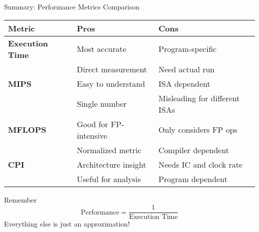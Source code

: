 \documentclass[aspectratio=169,12pt]{beamer}
\begin{document}
\begin{frame}{Summary: Performance Metrics Comparison}
\begin{table}[h]
\centering
\scriptsize
\begin{tabular}{lll}
\toprule
\textbf{Metric} & \textbf{Pros} & \textbf{Cons} \\
\midrule
\textbf{Execution Time} & Most accurate & Program-specific \\
& Direct measurement & Need actual run \\
\midrule
\textbf{MIPS} & Easy to understand & ISA dependent \\
& Single number & Misleading for different ISAs \\
\midrule
\textbf{MFLOPS} & Good for FP-intensive & Only considers FP ops \\
& Normalized metric & Compiler dependent \\
\midrule
\textbf{CPI} & Architecture insight & Needs IC and clock rate \\
& Useful for analysis & Program dependent \\
\bottomrule
\end{tabular}
\end{table}

\begin{block}{Remember}
$$\text{Performance} = \frac{1}{\text{Execution Time}}$$
Everything else is just an approximation!
\end{block}
\end{frame}
\end{document}
